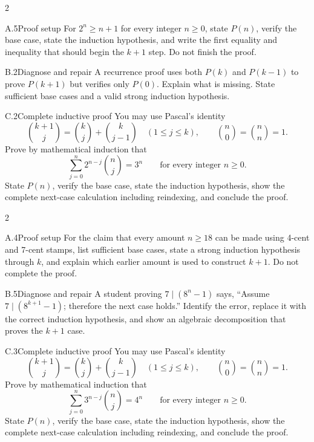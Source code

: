 \documentclass[9pt]{extarticle}
\begin{document}
\CoreWorkArea
\FormBreak
{}
\begin{multicols}{2}
\begin{CompactCoreProblem}{A.5}{Proof setup}
For $2^n\ge n+1$ for every integer $n\ge0$, state $P(n)$, verify the base case, state the induction hypothesis, and write the first equality and inequality that should begin the $k+1$ step. Do not finish the proof.
\end{CompactCoreProblem}
\begin{CompactCoreProblem}{B.2}{Diagnose and repair}
A recurrence proof uses both $P(k)$ and $P(k-1)$ to prove $P(k+1)$ but verifies only $P(0)$. Explain what is missing. State sufficient base cases and a valid strong induction hypothesis.
\end{CompactCoreProblem}
\end{multicols}
\begin{CompactCoreProblem}{C.2}{Complete inductive proof}
You may use Pascal's identity
\[
\binom{k+1}{j}=\binom{k}{j}+\binom{k}{j-1}
\quad(1\le j\le k),\qquad
\binom{n}{0}=\binom{n}{n}=1.
\]
Prove by mathematical induction that
\[
\sum_{j=0}^{n} 2^{n-j}\binom{n}{j}=3^n\qquad\text{for every integer }n\ge0.
\]
State $P(n)$, verify the base case, state the induction hypothesis, show the complete next-case calculation including reindexing, and conclude the proof.
\end{CompactCoreProblem}
\CoreWorkArea
\FormBreak
{}
\begin{multicols}{2}
\begin{CompactCoreProblem}{A.4}{Proof setup}
For the claim that every amount $n\ge18$ can be made using 4-cent and 7-cent stamps, list sufficient base cases, state a strong induction hypothesis through $k$, and explain which earlier amount is used to construct $k+1$. Do not complete the proof.
\end{CompactCoreProblem}
\begin{CompactCoreProblem}{B.5}{Diagnose and repair}
A student proving $7\mid(8^n-1)$ says, “Assume $7\mid(8^{k+1}-1)$; therefore the next case holds.” Identify the error, replace it with the correct induction hypothesis, and show an algebraic decomposition that proves the $k+1$ case.
\end{CompactCoreProblem}
\end{multicols}
\begin{CompactCoreProblem}{C.3}{Complete inductive proof}
You may use Pascal's identity
\[
\binom{k+1}{j}=\binom{k}{j}+\binom{k}{j-1}
\quad(1\le j\le k),\qquad
\binom{n}{0}=\binom{n}{n}=1.
\]
Prove by mathematical induction that
\[
\sum_{j=0}^{n} 3^{n-j}\binom{n}{j}=4^n\qquad\text{for every integer }n\ge0.
\]
State $P(n)$, verify the base case, state the induction hypothesis, show the complete next-case calculation including reindexing, and conclude the proof.
\end{CompactCoreProblem}
\end{document}

